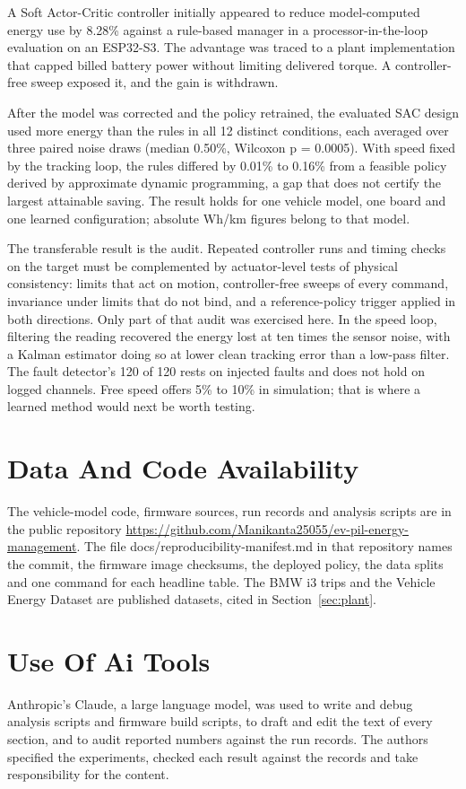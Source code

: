 \documentclass{ieeeaccess}
\begin{document}
A Soft Actor-Critic controller initially appeared to reduce model-computed energy use by 8.28\% against a rule-based manager in a processor-in-the-loop evaluation on an ESP32-S3. The advantage was traced to a plant implementation that capped billed battery power without limiting delivered torque. A controller-free sweep exposed it, and the gain is withdrawn.

After the model was corrected and the policy retrained, the evaluated SAC design used more energy than the rules in all 12 distinct conditions, each averaged over three paired noise draws (median 0.50\%, Wilcoxon p = 0.0005). With speed fixed by the tracking loop, the rules differed by 0.01\% to 0.16\% from a feasible policy derived by approximate dynamic programming, a gap that does not certify the largest attainable saving. The result holds for one vehicle model, one board and one learned configuration; absolute Wh/km figures belong to that model.

The transferable result is the audit. Repeated controller runs and timing checks on the target must be complemented by actuator-level tests of physical consistency: limits that act on motion, controller-free sweeps of every command, invariance under limits that do not bind, and a reference-policy trigger applied in both directions. Only part of that audit was exercised here. In the speed loop, filtering the reading recovered the energy lost at ten times the sensor noise, with a Kalman estimator doing so at lower clean tracking error than a low-pass filter. The fault detector's 120 of 120 rests on injected faults and does not hold on logged channels. Free speed offers 5\% to 10\% in simulation; that is where a learned method would next be worth testing.

\section*{Data And Code Availability}
The vehicle-model code, firmware sources, run records and analysis scripts are in the public repository \url{https://github.com/Manikanta25055/ev-pil-energy-management}. The file docs/reproducibility-manifest.md in that repository names the commit, the firmware image checksums, the deployed policy, the data splits and one command for each headline table. The BMW i3 trips and the Vehicle Energy Dataset are published datasets, cited in Section~\ref{sec:plant}.

\section*{Use Of Ai Tools}
Anthropic's Claude, a large language model, was used to write and debug analysis scripts and firmware build scripts, to draft and edit the text of every section, and to audit reported numbers against the run records. The authors specified the experiments, checked each result against the records and take responsibility for the content.
\end{document}
